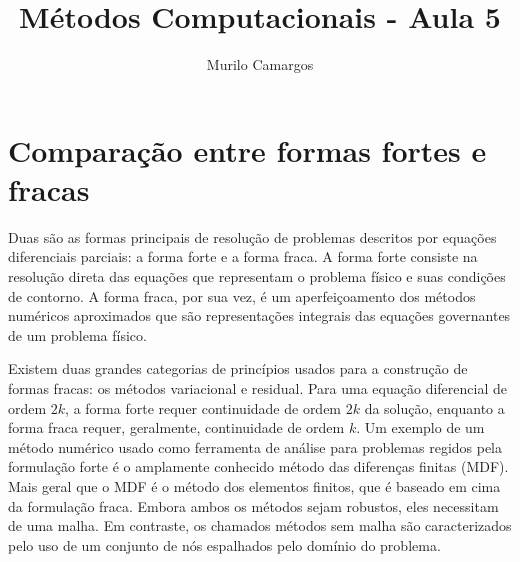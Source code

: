 \documentclass[10pt,a4paper]{article}
\author{Murilo Camargos}
\title{Métodos Computacionais - Aula 5}
\begin{document}

	\section{Comparação entre formas fortes e fracas}

	Duas são as formas principais de resolução de problemas descritos por equações diferenciais parciais: a forma forte e a forma fraca. A forma forte consiste na resolução direta das equações que representam o problema físico e suas condições de contorno. A forma fraca, por sua vez, é um aperfeiçoamento dos métodos numéricos aproximados que são representações integrais das equações governantes de um problema físico.
	
	Existem duas grandes categorias de princípios usados para a construção de formas fracas: os métodos variacional e residual. Para uma equação diferencial de ordem $2k$, a forma forte requer continuidade de ordem $2k$ da solução, enquanto a forma fraca requer, geralmente, continuidade de ordem $k$. Um exemplo de um método numérico usado como ferramenta de análise para problemas regidos pela formulação forte é o amplamente conhecido método das diferenças finitas (MDF). Mais geral que o MDF é o método dos elementos finitos, que é baseado em cima da formulação fraca. Embora ambos os métodos sejam robustos, eles necessitam de uma malha. Em contraste, os chamados métodos sem malha são caracterizados pelo uso de um conjunto de nós espalhados pelo domínio do problema.
\end{document}

